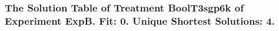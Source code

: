  \begin{frame}
 \fontsize{8pt}{9pt}\selectfont
 \frametitle{ The Solution Table of Treatment BoolT3sgp6k of Experiment ExpB. Fit: 0. Unique Shortest Solutions: 4. }

 \label{ExpBSolutionTable019.tex}  
 \end{frame}


